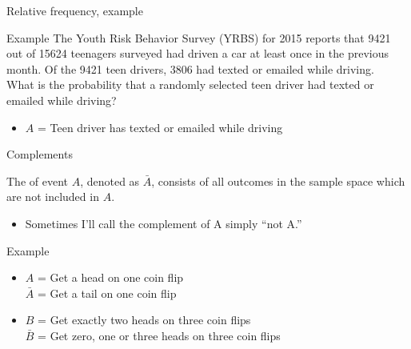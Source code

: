 \documentclass[xcolor=table, aspectratio=169, bigger]{beamer}
\begin{document}
\begin{frame}{Relative frequency, example}

\begin{exampleblock}{Example}
The Youth Risk Behavior Survey (YRBS) for 2015 reports that 9421 out of 15624 teenagers surveyed had driven a car at least once in the previous month. Of the 9421 teen drivers, 3806 had texted or emailed while driving. \\
\medskip
What is the probability that a randomly selected teen driver had texted or emailed while driving? 

\pause
\begin{itemize}
\item $A$ = Teen driver has texted or emailed while driving\\
\smallskip
{}
\end{itemize}

\end{exampleblock}

\end{frame}


\begin{frame}{Complements}
\begin{block}{}
The  of event $A$, denoted as $\bar A$, consists of all outcomes in the sample space which are not included in $A$.
\begin{itemize}
\item Sometimes I'll call the complement of A simply ``not A.''
\end{itemize}
\end{block}

\pause
\begin{exampleblock}{Example}
\begin{itemize}
\item $A$ = Get a head on one coin flip\\
\pause
$\bar A$ = Get a tail on one coin flip

\pause
\item $B$ = Get exactly two heads on three coin flips\\
\pause
$\bar B$ = Get zero, one or three heads on three coin flips
\end{itemize}
\end{exampleblock}
\end{frame}
 
\end{document}
